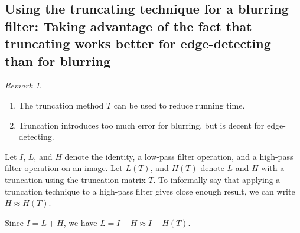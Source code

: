 \documentclass[12pt]{amsart}
\theoremstyle{definition}
\theoremstyle{remark}
\newtheorem{rem}[thm]{Remark}
\numberwithin{thm}{section}
\begin{document}
\subsection{Using the truncating technique for a blurring filter: Taking advantage of the fact that truncating works better for edge-detecting than for blurring}

\begin{rem}\label{rem:sharpening_vs_blurring}
\begin{enumerate}
\item The truncation method $T$ can be used to reduce running time.
\item Truncation introduces too much error for blurring, but is decent for edge-detecting.
\end{enumerate}
\end{rem}

Let $I$, $L$, and $H$ denote the identity, a low-pass filter operation, and a high-pass filter operation on an image.
Let $L(T)$, and $H(T)$ denote $L$ and $H$ with a truncation using the truncation matrix $T$.
To informally say that applying a truncation technique to a high-pass filter gives close enough result, we can write $H \approx H(T)$.

Since $I = L + H$, we have
$L = I - H \approx I - H(T)$.
\end{document}
